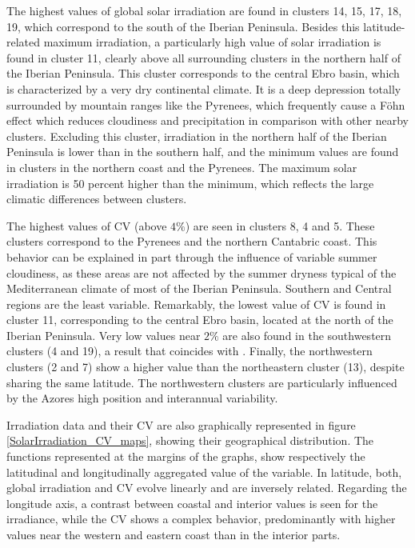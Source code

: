 \begin{subappendices}
The highest values of global solar irradiation are found in clusters 14, 15, 17, 18, 19, which correspond to the south of the Iberian Peninsula. Besides this latitude-related maximum irradiation, a particularly high value of solar irradiation is found in cluster 11, clearly above all surrounding clusters in the northern half of the Iberian Peninsula. This cluster corresponds to the central Ebro basin, which is characterized by a very dry continental climate. It is a deep depression totally surrounded by mountain ranges like the Pyrenees,  which frequently cause a Föhn effect which reduces cloudiness and precipitation in comparison with other nearby clusters. Excluding this cluster, irradiation in the northern half of the Iberian Peninsula is lower than in the southern half, and the minimum values are found in clusters in the northern coast and the Pyrenees. The maximum solar irradiation is 50 percent higher than the minimum, which reflects the large climatic differences between clusters.

The highest values of CV (above $4\%$) are seen in clusters 8, 4 and 5. These clusters correspond to the Pyrenees and the northern Cantabric coast. This behavior can be explained in part through the influence of variable summer cloudiness, as these areas are not affected by the summer dryness typical of the Mediterranean climate of most of the Iberian Peninsula. Southern and Central regions are the least variable. Remarkably, the lowest value of CV is found in cluster 11, corresponding to the central Ebro basin, located at the north of the Iberian Peninsula. Very low values near $2\%$   are also found in the southwestern clusters (4 and 19), a result that coincides with \cite{Gil2015}. Finally, the northwestern clusters (2 and 7) show a higher value than the northeastern cluster (13), despite sharing the same latitude. The northwestern clusters are particularly influenced by the Azores high position and interannual variability.

Irradiation data and their CV are also graphically represented in figure \ref{SolarIrradiation_CV_maps}, showing their geographical distribution. The functions represented at the margins of the graphs, show respectively the latitudinal and longitudinally aggregated value of the variable. In latitude, both, global irradiation and CV evolve linearly and are inversely related. Regarding the longitude axis, a contrast between coastal and interior values is seen for the irradiance, while the CV shows a complex behavior, predominantly with higher values near the western and eastern coast than in the interior parts.


\end{subappendices}
